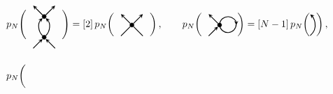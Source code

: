 \documentclass{compositio}
\theoremstyle{definition}
\numberwithin{equation}{section}
\begin{document}
\begin{align}
& 
p_{N} \Bigg( 
\begin{tikzpicture}[scale=0.5,baseline=(centre.base), inner sep=1mm, >=stealth]
\node (centre) at (0,0.75) [circle] {};
\node (bl) at (-1,-1) [circle] {};
\node (br) at (1,-1) [circle] {};
\node (tl) at (-1,2.5) [circle] {};
\node (tr) at (1,2.5) [circle] {};
\node (0) at (0,0) [circle,inner sep=1.5pt, thin,draw=black,fill= black] {};
\node (02) at (0,1.5) [circle,inner sep=1.5pt, thin,draw=black,fill= black] {};
\draw[->,  thick] (bl) -- (0); 
\draw[->,  thick] (br) -- (0); 
\draw[->,  thick] (0) to [out=135,in=225] (02); 
\draw[->,  thick] (0) to [out=45,in=-45] (02); 
\draw[->,  thick] (02) -- (tl); 
\draw[->,  thick] (02) -- (tr); 
\end{tikzpicture} 
\Bigg)
=
[2] \,
p_{N} \bigg( 
\begin{tikzpicture}[scale=0.5,baseline=-2pt, inner sep=1mm, >=stealth]
\node (bl) at (-1,-1) [circle] {};
\node (br) at (1,-1) [circle] {};
\node (tl) at (-1,1) [circle] {};
\node (tr) at (1,1) [circle] {};
\node (0) at (0,0) [circle,inner sep=1.5pt, thin,draw=black,fill= black] {};
\draw[-,  thick] (bl) -- (0); 
\draw[-,  thick] (br) -- (0); 
\draw[->,  thick] (0) -- (tl); 
\draw[->,  thick] (0) -- (tr); 
\end{tikzpicture} 
\bigg) \, , 
\qquad
p_{N} \bigg( 
\begin{tikzpicture}[scale=0.5,baseline=-2pt, inner sep=1mm, >=stealth]
\node (centre) at (0,0.75) [circle] {};
\node (bl) at (-1,-1) [circle] {};
\node (br) at (1,-1) [circle] {};
\node (tl) at (-1,1) [circle] {};
\node (r) at (1,0) [circle] {};
\node (0) at (0,0) [circle,inner sep=1.5pt, thin,draw=black,fill= black] {};
\draw[->,  thick] (bl) -- (0); 
\draw[->,  thick] (0) -- (tl); 
\draw[ ->, thick, shift={(0.6,0)} ]  (175:0.6) arc (175:0:0.6); 
\draw[ -, thick, shift={(-0.6,0)} ]  (0:0.6) arc (-175:0:0.6); 
\end{tikzpicture} 
\bigg)
=
[N-1] \,
p_{N} \bigg( 
\begin{tikzpicture}[scale=0.5,baseline=-2pt, inner sep=1mm, >=stealth]
\draw[ ->, thick, shift={(-2.5,0)} ]  (-50:1) arc (-50:50:1); 
\end{tikzpicture} 
\bigg) \, , \nonumber
\\
& p_{N} \bigg( 
\begin{tikzpicture}[scale=0.5,baseline=-2pt, inner sep=1mm, >=stealth]
\node (centre) at (0,0.75) [circle] {};
\node (bl) at (-1,-1) [circle] {};
\node (br) at (2.5,-1) [circle] {};
\node (tl) at (-1,1) [circle] {};

\end{tikzpicture}
\end{align}
\end{document}
